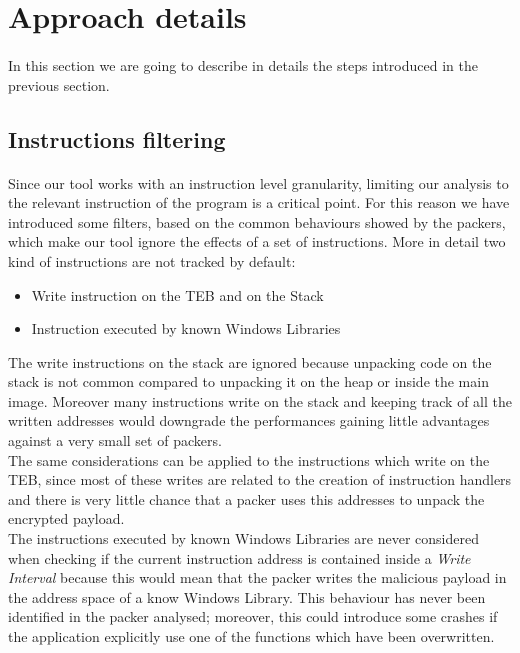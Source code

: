 \section{Approach details}
\paragraph{}
In this section we are going to describe in details the steps introduced in the previous section.

\subsection{Instructions filtering}
\paragraph{}
Since our tool works with an instruction level granularity, limiting our analysis to the relevant instruction of the program is a critical point. For this reason we have introduced some filters, based on the common behaviours showed by the packers, which make our tool ignore the effects of a set of instructions. More in detail two kind of instructions are not tracked by default:
\begin{itemize}
	\item Write instruction on the \ac{TEB} and on the Stack
	\item Instruction executed by known Windows Libraries
\end{itemize}
The write instructions on the stack are ignored because unpacking code on the stack is not common compared to unpacking it on the heap or inside the main image. Moreover many instructions write on the stack and keeping track of all the written addresses would downgrade the performances gaining little advantages against a very small set of packers.\\
The same considerations can be applied to the instructions which write on the \ac{TEB}, since most of these writes are related to the creation of instruction handlers and there is very little chance that a packer uses this addresses to unpack the encrypted payload.\\
The instructions executed by known Windows Libraries are never considered when checking if the current instruction address is contained inside a \textit{Write Interval} because this would mean that the packer writes the malicious payload in the address space of a know Windows Library. This behaviour has never been identified in the packer analysed; moreover, this could introduce some crashes if the application explicitly use one of the functions which have been overwritten.

